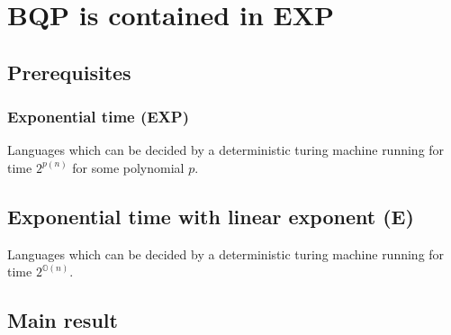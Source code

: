 \documentclass[../main.tex]{subfiles}
\begin{document}
\section{BQP is contained in EXP}

\subsection{Prerequisites}

\subsubsection{Exponential time (EXP)}

Languages which can be decided by a deterministic turing machine running for time $2^{p(n)}$ for some polynomial $p$.

\subsection{Exponential time with linear exponent (E)}

Languages which can be decided by a deterministic turing machine running for time $2^{\mathbb{O}(n)}$.

\subsection{Main result}
\end{document}
